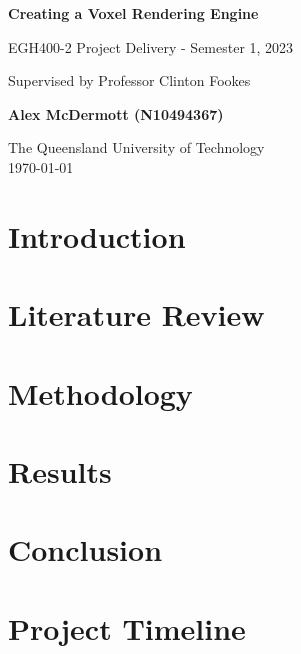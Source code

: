 \documentclass[titlepage]{article}
\begin{document}
\begin{titlepage}
    \begin{center}
        \vspace*{7cm}

        \Huge
        \textbf{Creating a Voxel Rendering Engine}

        \vspace{0.5cm}

        \Large
        EGH400-2 Project Delivery - Semester 1, 2023

        \vspace{0.25cm}

        \large
        Supervised by Professor Clinton Fookes

        \vspace{0.5cm}

        \Large
        \textbf{Alex McDermott (N10494367)}

        \vfill

        \Large
        The Queensland University of Technology\\
        \today
    \end{center}
\end{titlepage}


\begin{abstract}
\end{abstract}

\tableofcontents
\listoffigures
\printnoidxglossary[type=\acronymtype]
\newpage

\section{Introduction}

\section{Literature Review}

\section{Methodology}

\section{Results}

\section{Conclusion}

\appendix

\section{Project Timeline}


\end{document}
